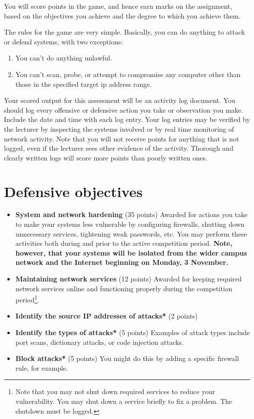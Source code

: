 \documentclass{article}   	%
\begin{document}
You will score points in the game, and hence earn marks on the assignment, based on the objectives you achieve and the degree to which you achieve them.

The rules for the game are very simple.  Basically, you can do anything to attack or defend systems, with two exceptions:

\begin{enumerate}
  \item You can't do anything unlawful.
  \item You can't scan, probe, or attempt to compromise any computer other than those in the specified target ip address range.
	  \end{enumerate}

Your scored output for this assessment will be an activity log document. You should log every offensive or defensive action you take or observation you make.  Include the date and  time with each log entry.  Your log entries may be verified by the lecturer by inspecting the systems involved or by real time monitoring of network activity. Note that you will not receive points for anything that is not logged, even if the lecturer sees other evidence of the activity.  Thorough and clearly written logs will score more points than poorly written ones.


\section*{Defensive objectives}
\begin{itemize}
	\item \textbf{System and network hardening} (35 points)  Awarded for actions you take to make your systems less vulnerable by configuring firewalls, shutting down unnecessary services, tightening weak passwords, etc.  You may perform these activities both during and prior to the active competition period. \textbf{Note, however, that your systems will be isolated from the wider campus network and the Internet beginning on Monday, 3 November.}
  \item \textbf{Maintaining network services} (12 points)  Awarded for keeping required network services online and functioning properly during the competition period\footnote{Note that you may not shut down required services to reduce your vulnerability. You may shut down a service briefly to fix a problem. The shutdown must be logged.}.
  \item \textbf{Identify the source IP addresses of attacks*} (2 points)
  \item \textbf{Identify the types of attacks*} (5 points) Examples of attack types include port scans, dictionary attacks, or code injection attacks.
  \item \textbf{Block attacks*} (5 points) You might do this by adding a specific firewall rule, for example.
  
\end{itemize}
\end{document}
